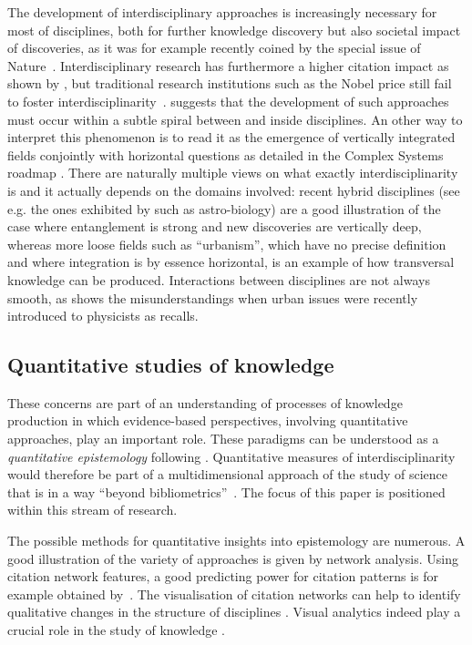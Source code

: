 The development of interdisciplinary approaches is increasingly necessary for most of disciplines, both for further knowledge discovery but also societal impact of discoveries, as it was for example recently coined by the special issue of Nature~\citep{natureInterdisc}. Interdisciplinary research has furthermore a higher citation impact as shown by \cite{CHEN20151034}, but traditional research institutions such as the Nobel price still fail to foster interdisciplinarity~\citep{szell2018nobel}. \cite{banos2013pour} suggests that the development of such approaches must occur within a subtle spiral between and inside disciplines. An other way to interpret this phenomenon is to read it as the emergence of vertically integrated fields conjointly with horizontal questions as detailed in the Complex Systems roadmap \citep{2009arXiv0907.2221B}. There are naturally multiple views on what exactly interdisciplinarity is and it actually depends on the domains involved: recent hybrid disciplines (see e.g. the ones exhibited by \cite{bais2010praise} such as astro-biology) are a good illustration of the case where entanglement is strong and new discoveries are vertically deep, whereas more loose fields such as ``urbanism'', which have no precise definition and where integration is by essence horizontal, is an example of how transversal knowledge can be produced. Interactions between disciplines are not always smooth, as shows the misunderstandings when urban issues were recently introduced to physicists as \cite{dupuy2015sciences} recalls.


\subsection*{Quantitative studies of knowledge}

These concerns are part of an understanding of processes of knowledge production in which evidence-based perspectives, involving quantitative approaches, play an important role. These paradigms can be understood as a \emph{quantitative epistemology} following \cite{chavalarias2013phylomemetic}. Quantitative measures of interdisciplinarity would therefore be part of a multidimensional approach of the study of science that is in a way ``beyond bibliometrics''~\citep{cronin2014beyond}. The focus of this paper is positioned within this stream of research.

The possible methods for quantitative insights into epistemology are numerous. A good illustration of the variety of approaches is given by network analysis. Using citation network features, a good predicting power for citation patterns is for example obtained by~\cite{2013arXiv1310.8220N}. The visualisation of citation networks can help to identify qualitative changes in the structure of disciplines \citep{chen2004searching}. Visual analytics indeed play a crucial role in the study of knowledge \citep{borner2003visualizing}.

